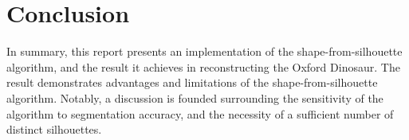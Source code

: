 \section{Conclusion}

In summary, this report presents an implementation of the shape-from-silhouette algorithm, and the result it achieves in reconstructing the Oxford Dinosaur. The result demonstrates advantages and limitations of the shape-from-silhouette algorithm. Notably, a discussion is founded surrounding the sensitivity of the algorithm to segmentation accuracy, and the necessity of a sufficient number of distinct silhouettes.
